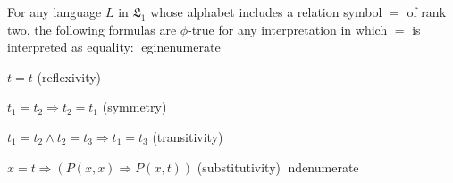 For any language $L$ in $\mathfrak{L}_1$ whose alphabet includes a relation symbol $=$ of rank two, the following formulas are $\phi$-true for any interpretation in which $=$ is interpreted as equality:
egin{enumerate}
\item $t = t$ (reflexivity)
\item $t_1 = t_2 \Rightarrow t_2 = t_1$ (symmetry)
\item $t_1 = t_2 \wedge t_2 = t_3 \Rightarrow t_1 = t_3$ (transitivity)
\item $x = t \Rightarrow (P(x,x) \Rightarrow P(x,t))$ (substitutivity)
nd{enumerate}
